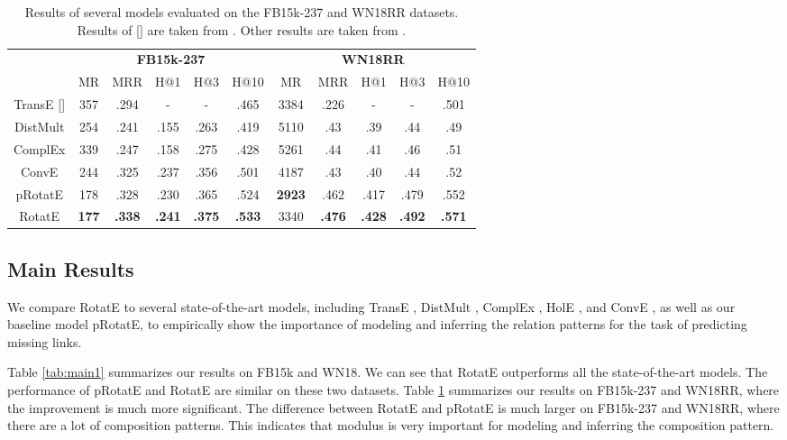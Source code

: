 \documentclass{article} \usepackage{iclr2019_conference,times}
\def\method{RotatE}
\def\baseline{pRotatE}
\begin{document}
\begin{table}[t]
\small
\centering
\begin{tabular}{|c|c c c c c|c c c c c|}
\hline
& \multicolumn{5}{c|}{\textbf{FB15k-237}} & \multicolumn{5}{c|}{\textbf{WN18RR}}\\
\cline{2-11}
& MR & MRR & H@1 & H@3 & H@10 & MR & MRR & H@1 & H@3 & H@10 \\
\hline
TransE [] & 357 & .294 & - & - & .465 & 3384 & .226 & - & - & .501\\
\hline
DistMult & 254 & .241 & .155 & .263 & .419 & 5110 & .43 & .39 & .44 & .49\\
\hline
ComplEx & 339 & .247 & .158 & .275 & .428 & 5261 & .44 & .41 & .46 & .51\\
\hline
ConvE & 244 & .325 & .237 & .356 & .501 & 4187 & .43 & .40 & .44 & .52 \\
\hline
\hline
\baseline{} & 178 & .328 & .230 & .365 & .524 & \textbf{2923} & .462 & .417 & .479 & .552\\
\hline
\method{} & \textbf{177} & \textbf{.338} & \textbf{.241} & \textbf{.375} & \textbf{.533} & 3340 & \textbf{.476} & \textbf{.428} & \textbf{.492} & \textbf{.571}\\
\hline
\end{tabular}
\caption{Results of several models evaluated on the FB15k-237 and WN18RR datasets. Results of [] are taken from  \citep{nguyen2017novel}. Other results are taken from  \citep{dettmers2017convolutional}.}
\label{tab:main2}
\end{table}

\subsection{Main Results}

We compare \method{} to several state-of-the-art models, including TransE  \citep{bordes2013translating}, DistMult  \citep{yang2014embedding}, ComplEx  \citep{trouillon2016complex}, HolE  \citep{nickel2016holographic},
and ConvE  \citep{dettmers2017convolutional}, as well as our baseline model \baseline{}, to empirically show  the importance of modeling and inferring the relation patterns for the task of predicting missing links.

Table \ref{tab:main1} summarizes our results on FB15k and WN18. We can see that RotatE outperforms all the state-of-the-art models. The performance of \baseline{} and \method{} are similar on these two datasets. Table \ref{tab:main2} summarizes our results on FB15k-237 and WN18RR, where 
the improvement is much more significant. The difference between \method{} and \baseline{} is much larger on FB15k-237 and WN18RR, where there are a lot of composition patterns. This indicates that modulus is very important for modeling and inferring the composition pattern.
\end{document}
